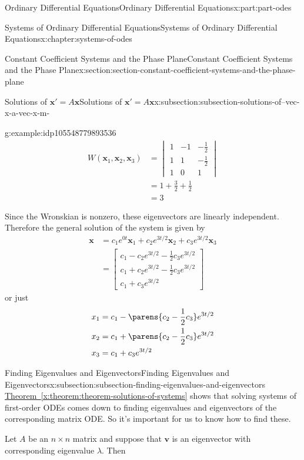 \documentclass[oneside,10pt,]{book}
\newcommand{\xreffont}{\relax}
\numberwithin{equation}{part}
\renewcommand{\vec}[1]{\mathbf{#1}}
\newcommand{\amp}{&}
\begin{document}
\begin{partptx}{Ordinary Differential Equations}{}{Ordinary Differential Equations}{}{}{x:part:part-odes}
\begin{chapterptx}{Systems of Ordinary Differential Equations}{}{Systems of Ordinary Differential Equations}{}{}{x:chapter:systems-of-odes}
\begin{sectionptx}{Constant Coefficient Systems and the Phase Plane}{}{Constant Coefficient Systems and the Phase Plane}{}{}{x:section:section-constant-coefficient-systems-and-the-phase-plane}
\begin{subsectionptx}{Solutions of \(\vec{x}' = A\vec{x}\)}{}{Solutions of \(\vec{x}' = A\vec{x}\)}{}{}{x:subsection:subsection-solutions-of--vec-x-a-vec-x-m-}
\begin{example}{}{g:example:idp105548779893536}
\begin{align*}
W(\vec{x}_{1},\vec{x}_{2},\vec{x}_{3}) \amp = \begin{vmatrix} 1  \amp  -1  \amp  -\frac{1}{2} \\ 1 \amp  1 \amp  -\frac{1}{2} \\ 1 \amp  0 \amp  1\end{vmatrix}\\
\amp = 1+\frac{3}{2}+\frac{1}{2}\\
\amp = 3
\end{align*}
%
\par
Since the Wronskian is nonzero, these eigenvectors are linearly independent. Therefore the general solution of the system is given by%
\begin{align*}
\vec{x} \amp = c_{1}e^{0t}\vec{x}_{1}+c_{2}e^{3t/2}\vec{x}_{2}+c_{3}e^{3t/2}\vec{x}_{3}\\
\amp = \begin{bmatrix}c_{1}-c_{2}e^{3t/2}-\frac{1}{2}c_{3}e^{3t/2} \\ c_{1}+c_{2}e^{3t/2}-\frac{1}{2}c_{3}e^{3t/2} \\ c_{1}+c_{3}e^{3t/2}\end{bmatrix}
\end{align*}
or just%
\begin{align*}
x_{1} \amp = c_{1}-\parens{c_{2}-\frac{1}{2}c_{3}}e^{3t/2}\\
x_{2} \amp = c_{1}+\parens{c_{2}-\frac{1}{2}c_{3}}e^{3t/2}\\
x_{3} \amp = c_{1}+c_{3}e^{3t/2}
\end{align*}
%
\end{example}
\end{subsectionptx}
%
%
\typeout{************************************************}
\typeout{************************************************}
%
\begin{subsectionptx}{Finding Eigenvalues and Eigenvectors}{}{Finding Eigenvalues and Eigenvectors}{}{}{x:subsection:subsection-finding-eigenvalues-and-eigenvectors}
\hyperref[x:theorem:theorem-solutions-of-systems]{Theorem~{\xreffont\ref{x:theorem:theorem-solutions-of-systems}}} shows that solving systems of first-order ODEs comes down to finding eigenvalues and eigenvectors of the corresponding matrix ODE. So it's important for us to know how to find these.%
\par
Let \(A\) be an \(n\times n\) matrix and suppose that \(\vec{v}\) is an eigenvector with corresponding eigenvalue \(\lambda\). Then%
\begin{equation*}

\end{equation*}
\end{subsectionptx}
\end{sectionptx}
\end{chapterptx}
\end{partptx}
\end{document}
